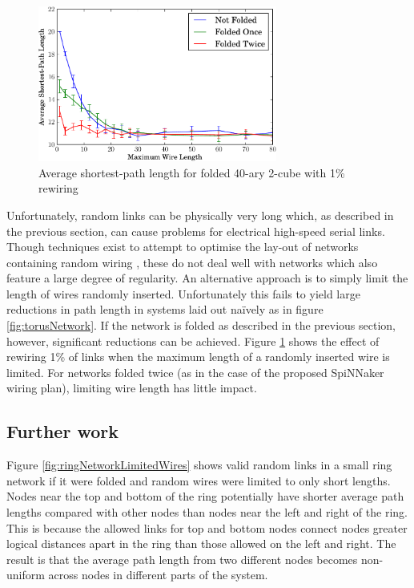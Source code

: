 			\begin{figure}
				\center
				\includegraphics[width=0.7\textwidth]{figures/smallWorldLimitedWiring}
				\caption{Average shortest-path length for folded 40-ary 2-cube with 1\%
				rewiring}
				\label{fig:smallWorldLimitedWiring}
			\end{figure}
			
			Unfortunately, random links can be physically very long which, as
			described in the previous section, can cause problems for electrical
			high-speed serial links.  Though techniques exist to attempt to optimise
			the lay-out of networks containing random wiring \cite{koibuchi13}, these
			do not deal well with networks which also feature a large degree of
			regularity. An alternative approach is to simply limit the length of wires
			randomly inserted.  Unfortunately this fails to yield large reductions in
			path length in systems laid out na\"ively as in figure
			\ref{fig:torusNetwork}. If the network is folded as described in the
			previous section, however, significant reductions can be achieved. Figure
			\ref{fig:smallWorldLimitedWiring} shows the effect of rewiring 1\% of
			links when the maximum length of a randomly inserted wire is limited.  For
			networks folded twice (as in the case of the proposed SpiNNaker wiring
			plan), limiting wire length has little impact.
		
		\subsection{Further work}
			
			Figure \ref{fig:ringNetworkLimitedWires} shows valid random links in a
			small ring network if it were folded and random wires were limited to only
			short lengths. Nodes near the top and bottom of the ring potentially have
			shorter average path lengths compared with other nodes than nodes near the
			left and right of the ring. This is because the allowed links for top and
			bottom nodes connect nodes greater logical distances apart in the ring
			than those allowed on the left and right. The result is that the average
			path length from two different nodes becomes non-uniform across nodes in
			different parts of the system.
			
